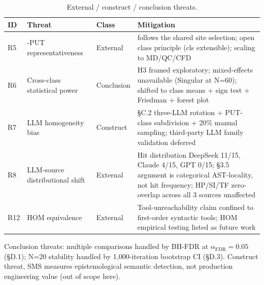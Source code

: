 \documentclass[manuscript,screen,review]{acmart}
\begin{document}
{%
\begin{longtable}[]{@{}
  >{\raggedright\arraybackslash}p{}
  >{\raggedright\arraybackslash}p{}
  >{\raggedright\arraybackslash}p{}
  >{\raggedright\arraybackslash}p{}@{}}
\caption{External / construct / conclusion threats.}\label{tab:p2-28}\\
\toprule\noalign{}
\begin{minipage}[b]{\linewidth}\raggedright
ID
\end{minipage} & \begin{minipage}[b]{\linewidth}\raggedright
Threat
\end{minipage} & \begin{minipage}[b]{\linewidth}\raggedright
Class
\end{minipage} & \begin{minipage}[b]{\linewidth}\raggedright
Mitigation
\end{minipage} \\
\midrule\noalign{}
\endfirsthead
\endhead
\bottomrule\noalign{}
\endlastfoot
R5 & 12-PUT representativeness & External & follows the shared site selection;
open class principle (cls extensible); scaling to MD/QC/CFD \\
R6 & Cross-class statistical power & Conclusion & H3 framed exploratory;
mixed-effects unavailable (Singular at N=60); shifted to class means +
sign test + Friedman + forest plot \\
R7 & LLM homogeneity bias & Construct & §C.2 three-LLM rotation +
PUT-class subdivision + 20\% manual sampling; third-party LLM family
validation deferred \\
R8 & LLM-source distributional shift & External & Hit distribution
DeepSeek 11/15, Claude 4/15, GPT 0/15; §3.5 argument is categorical
AST-locality, not hit frequency; HP/SI/TF zero-overlap across all 3
sources unaffected \\
R12 & HOM equivalence & External & Tool-unreachability claim confined to
first-order syntactic tools; HOM empirical testing listed as future
work \\
\end{longtable}
}

Conclusion threats: multiple comparisons handled by BH-FDR at
$\alpha_{\mathrm{FDR}}=0.05$ (§D.1); N=20 stability handled by 1,000-iteration
bootstrap CI (§D.3). Construct threat, SMS measures epistemological
semantic detection, not production engineering value (out of scope here).
\end{document}
